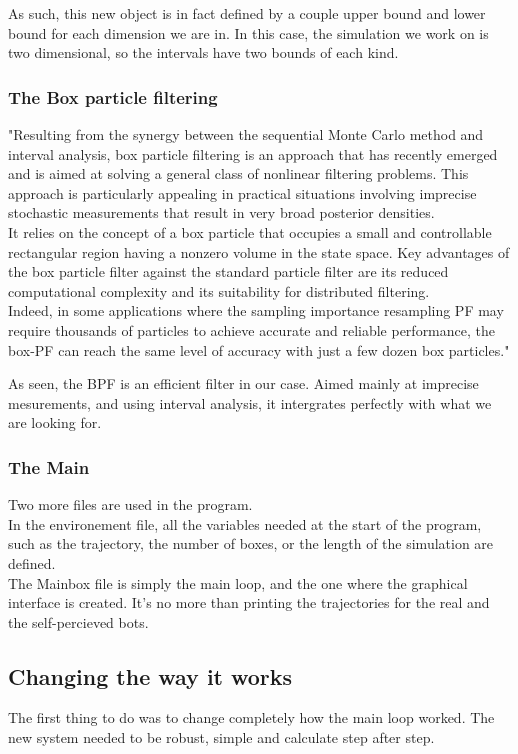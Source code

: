 As such, this new object is in fact defined by a couple upper bound and lower bound for each dimension we are in.
In this case, the simulation we work on is two dimensional, so the intervals have two bounds of each kind.
\subsubsection{The Box particle filtering}
"Resulting from the synergy between the sequential Monte Carlo method and interval analysis, box particle filtering is an approach that has recently emerged and is aimed at solving a general class of nonlinear filtering problems.
This approach is particularly appealing in practical situations involving imprecise stochastic measurements that result in very broad posterior densities.\\

It relies on the concept of a box particle that occupies a small and controllable rectangular region having a nonzero volume in the state space.
Key advantages of the box particle filter against the standard particle filter are its reduced computational complexity and its suitability for distributed filtering.\\

Indeed, in some applications where the sampling importance resampling PF may require thousands of particles to achieve accurate and reliable performance, the box-PF can reach the same level of accuracy with just a few dozen box particles."\parencite{BPF}

As seen, the BPF is an efficient filter in our case. Aimed mainly at imprecise mesurements, and using interval analysis, it intergrates perfectly with what we are looking for.

\subsubsection{The Main}
Two more files are used in the program.\\

In the environement file, all the variables needed at the start of the program,
 such as the trajectory, the number of boxes, or the length of the simulation are defined.\\

The Mainbox file is simply the main loop, and the one where the graphical interface is created. It's no more than printing the trajectories for the real and the self-percieved bots.

\subsection{Changing the way it works}
The first thing to do was to change completely how the main loop worked.
The new system needed to be robust, simple and calculate step after step.\\

